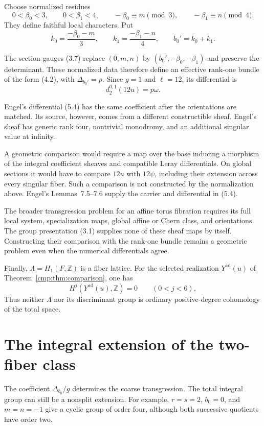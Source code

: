\documentclass[11pt]{article}
\numberwithin{equation}{section}
\begin{document}
Choose normalized residues
\[
 0<\beta_0<3,\qquad 0<\beta_1<4,\qquad
 -\beta_0\equiv m\pmod3,\qquad
 -\beta_1\equiv n\pmod4.
\]
They define faithful local characters. Put
\[
 k_0=\frac{-\beta_0-m}{3},\qquad
 k_1=\frac{-\beta_1-n}{4},\qquad
 b_0'=k_0+k_1.
\]

The section gauges (3.7) replace $(0,m,n)$ by
$(b_0',-\beta_0,-\beta_1)$ and preserve the determinant.
These normalized data therefore define an effective rank-one bundle
of the form (4.2), with $\Delta_{b_0'}=p$.
Since $g=1$ and $\ell=12$, its differential is
\[
                         d_2^{0,1}(12u)=p\omega.
\]

Engel's differential (5.4) has the same coefficient after the
orientations are matched. Its source, however, comes from a different
constructible sheaf. Engel's sheaf has generic rank four, nontrivial
monodromy, and an additional singular value at infinity.

A geometric comparison would require a map over the base inducing a
morphism of the integral coefficient sheaves and compatible Leray
differentials. On global sections it would have to compare
$12u$ with $12\psi$, including their extension across every singular
fiber. Such a comparison is not constructed by the normalization above.
Engel's Lemmas~7.5--7.6 supply the carrier and differential in (5.4).

The broader transgression problem for an affine torus fibration requires
its full local system, specialization maps, global affine or Chern class,
and orientations. The group presentation (3.1) supplies none of these
sheaf maps by itself. Constructing their comparison with the rank-one
bundle remains a geometric problem even when the numerical
differentials agree.

Finally, $\Lambda=H_1(F,\mathbb Z)$ is a fiber lattice. For the
selected realization $Y^{\mathrm{ad}}(u)$ of
Theorem~\ref{cmp:thm:comparison}, one has
\[
 H^j(Y^{\mathrm{ad}}(u),\mathbb Z)=0\qquad(0<j<6),
\]
Thus neither $\Lambda$ nor its discriminant group is ordinary
positive-degree cohomology of the total space.

\section{The integral extension of the two-fiber class}

The coefficient $\Delta_{b_0}/g$ determines the coarse transgression.
The total integral group can still be a nonsplit extension.  For example,
$r=s=2$, $b_0=0$, and $m=n=-1$ give a cyclic group of order four,
although both successive quotients have order two.
\end{document}
